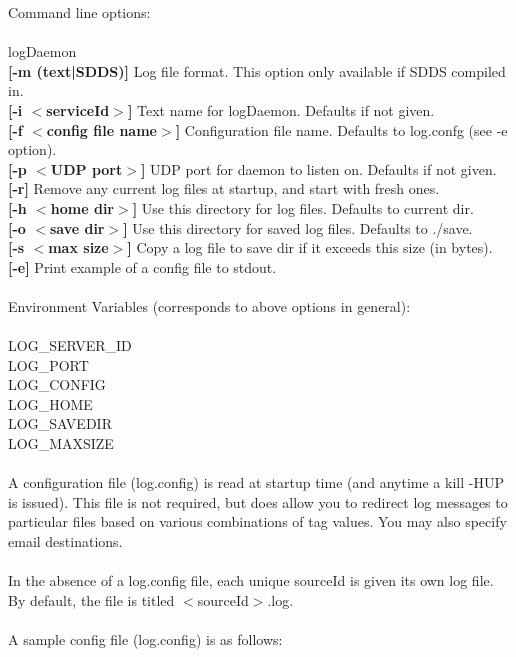 \documentclass[11pt]{article}
\begin{document}
Command line options:\\
\\
logDaemon\\
{\bf [-m (text|SDDS)]} Log file format. This  option only available if SDDS compiled 
in.\\
{\bf [-i $<$serviceId$>$]} Text name for logDaemon. Defaults if not given.\\
{\bf [-f $<$config file name$>$]} Configuration file  name. Defaults to log.confg (see -e 
option).\\
{\bf [-p $<$UDP port$>$]} UDP port for daemon to listen on. Defaults if not given.\\
{\bf [-r]} Remove any current log files at startup, and start with fresh ones.\\
{\bf [-h $<$home dir$>$]} Use this directory for log files. Defaults to current dir.\\
{\bf [-o $<$save dir$>$]} Use this directory for saved log files. Defaults to ./save.\\
{\bf [-s $<$max size$>$]} Copy a log file to save dir if it exceeds this size (in bytes).\\
{\bf [-e]} Print example of a config file to stdout.\\
\\
Environment Variables (corresponds to above options in general):\\
\\
LOG\_SERVER\_ID\\
LOG\_PORT\\
LOG\_CONFIG\\
LOG\_HOME\\
LOG\_SAVEDIR\\
LOG\_MAXSIZE\\
\\
A configuration file (log.config) is read at startup time (and anytime a kill -HUP is issued). This file is not required, but does allow you to redirect log messages to particular files based on various combinations of tag values. You may also specify email destinations.\\
\\
In the absence of a log.config file, each unique sourceId is given its own log file. By default, the file is titled $<$sourceId$>$.log.\\
\\
A sample config file (log.config) is as follows:
\end{document}
